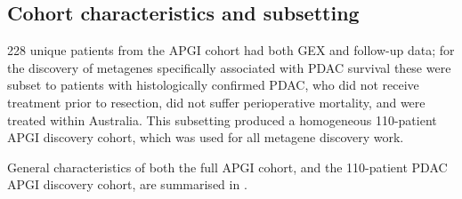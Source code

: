 \documentclass[dissertation.tex]{subfiles}
\begin{document}
\subsection{Cohort characteristics and subsetting}
228 unique patients from the \gls{APGI} cohort had both \gls{GEX} and follow-up data; for the discovery of metagenes specifically associated with \gls{PDAC} survival these were subset to patients with histologically confirmed \gls{PDAC}, who did not receive treatment prior to resection, did not suffer perioperative mortality, and were treated within Australia.  This subsetting produced a homogeneous 110-patient \gls{APGI} discovery cohort, which was used for all metagene discovery work.

General characteristics of both the full \gls{APGI} cohort, and the 110-patient \gls{PDAC} \gls{APGI} discovery cohort, are summarised in .
\end{document}
